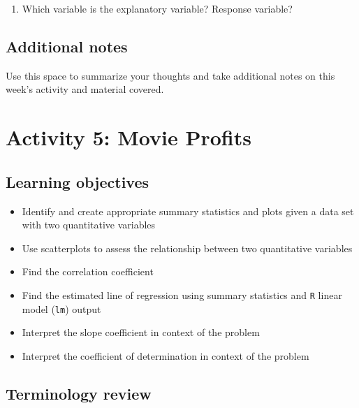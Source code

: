 \documentclass[
]{report}
\providecommand{\tightlist}{%
  \setlength{\itemsep}{0pt}\setlength{\parskip}{0pt}}
\begin{document}
\vspace{0.2in}

\begin{enumerate}
\def\labelenumi{\arabic{enumi}.}
\setcounter{enumi}{2}
\tightlist
\item
  Which variable is the explanatory variable? Response variable?
\end{enumerate}

\vspace{0.5in}

\hypertarget{additional-notes}{%
\section{Additional notes}\label{additional-notes}}

Use this space to summarize your thoughts and take additional notes on this week's activity and material covered.

\hypertarget{activity-5-movie-profits}{%
\chapter{Activity 5: Movie Profits}\label{activity-5-movie-profits}}

\hypertarget{learning-objectives}{%
\section{Learning objectives}\label{learning-objectives}}

\begin{itemize}
\item
  Identify and create appropriate summary statistics and plots
  given a data set with two quantitative variables
\item
  Use scatterplots to assess the relationship between two quantitative variables
\item
  Find the correlation coefficient
\item
  Find the estimated line of regression using summary statistics and \texttt{R} linear model (\texttt{lm}) output
\item
  Interpret the slope coefficient in context of the problem
\item
  Interpret the coefficient of determination in context of the problem
\end{itemize}

\hypertarget{terminology-review}{%
\section{Terminology review}\label{terminology-review}}
\end{document}
